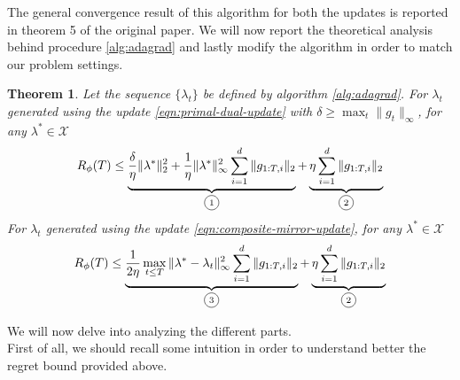 \documentclass[notitlepage]{article}
\newcommand*\circled[1]{\tikz[baseline=(char.base)]{\node[shape=circle,draw,inner sep=2pt] (char) {#1};}}
\newtheorem{theorem}{Theorem}[section]
\begin{document}
The general convergence result of this algorithm for both the updates is reported in theorem 5 of the original paper. We will now report the theoretical analysis behind procedure \ref{alg:adagrad} and lastly modify the algorithm in order to match our problem settings.
\begin{theorem}
  Let the sequence $\{\lambda_t\}$ be defined by algorithm \ref{alg:adagrad}. For $\lambda_t$ generated using the update \eqref{eqn:primal-dual-update} with $\delta \ge \max_t \|g_t\|_\infty$, for any $\lambda^* \in \mathcal{X}$
  \begin{equation} 
    R_\phi(T) \le \underbrace{\frac{\delta}{\eta} \|\lambda^*\|_2^2 + \frac{1}{\eta} \|\lambda^*\|_\infty^2 \sum_{i=1}^d \|g_{1:T,i}\|_2}_{\text{\circled{1}}} + \underbrace{\eta \sum_{i=1}^d \|g_{1:T,i}\|_2}_{\text{\circled{2}}} 
    \label{eqn:pd-regret}
  \end{equation}
  For $\lambda_t$ generated using the update \eqref{eqn:composite-mirror-update}, for any $\lambda^* \in \mathcal{X}$
  \begin{equation}
    R_\phi(T) \le \underbrace{\frac{1}{2\eta} \max_{t \le T} \|\lambda^* - \lambda_t\|_\infty^2 \sum_{i=1}^d \|g_{1:T,i}\|_2}_{\text{\circled{3}}} + \underbrace{\eta \sum_{i=1}^d \|g_{1:T,i}\|_2}_{\text{\circled{2}}} 
    \label{eqn:cm-regret}  
  \end{equation}
  \label{th:regrets}
\end{theorem}
We will now delve into analyzing the different \circled{$\cdot$} parts.\\
First of all, we should recall some intuition in order to understand better the regret bound provided above.\\
\end{document}

